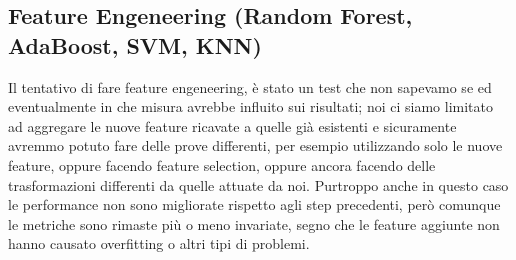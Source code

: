 \subsection{Feature Engeneering (Random Forest, AdaBoost, SVM, KNN)}
Il tentativo di fare feature engeneering, è stato un test che non sapevamo se ed eventualmente in che misura avrebbe influito sui risultati; noi ci siamo limitato ad aggregare le nuove feature ricavate a quelle già esistenti e sicuramente avremmo potuto fare delle prove differenti, per esempio utilizzando solo le nuove feature, oppure facendo feature selection, oppure ancora facendo delle trasformazioni differenti da quelle attuate da noi.
Purtroppo anche in questo caso le performance non sono migliorate rispetto agli step precedenti, però comunque le metriche sono rimaste più o meno invariate, segno che le feature aggiunte non hanno causato overfitting o altri tipi di problemi.

